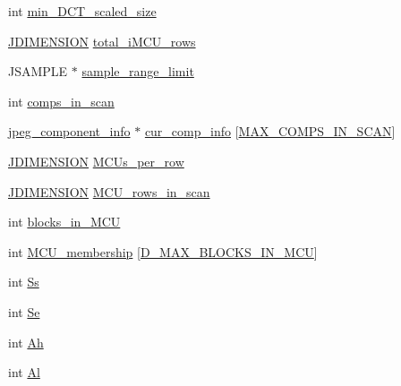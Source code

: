 \begin{DoxyCompactItemize}
\item 
int \hyperlink{structjpeg__decompress__struct_a88783fbd676f2e16a92162a324e79795}{min\+\_\+\+D\+C\+T\+\_\+scaled\+\_\+size}
\item 
\hyperlink{jmorecfg_8h_a04ed4674f6f1d0d50ec241531e38274f}{J\+D\+I\+M\+E\+N\+S\+I\+ON} \hyperlink{structjpeg__decompress__struct_ab210038772e2c74c35b6c0a36db9c6a9}{total\+\_\+i\+M\+C\+U\+\_\+rows}
\item 
J\+S\+A\+M\+P\+LE $\ast$ \hyperlink{structjpeg__decompress__struct_a7208357f11ec6db26e55d7b01d8c7a1b}{sample\+\_\+range\+\_\+limit}
\item 
int \hyperlink{structjpeg__decompress__struct_a2a28db865b9d49bfa9bc6335abf331c3}{comps\+\_\+in\+\_\+scan}
\item 
\hyperlink{structjpeg__component__info}{jpeg\+\_\+component\+\_\+info} $\ast$ \hyperlink{structjpeg__decompress__struct_ab640afe8fb70108caed0c2520aab0c2a}{cur\+\_\+comp\+\_\+info} \mbox{[}\hyperlink{jpeglib_8h_adc7013da016c19051dc623fb3d8b35b4}{M\+A\+X\+\_\+\+C\+O\+M\+P\+S\+\_\+\+I\+N\+\_\+\+S\+C\+AN}\mbox{]}
\item 
\hyperlink{jmorecfg_8h_a04ed4674f6f1d0d50ec241531e38274f}{J\+D\+I\+M\+E\+N\+S\+I\+ON} \hyperlink{structjpeg__decompress__struct_aafebfaa0046cc8b449ce2401c174697f}{M\+C\+Us\+\_\+per\+\_\+row}
\item 
\hyperlink{jmorecfg_8h_a04ed4674f6f1d0d50ec241531e38274f}{J\+D\+I\+M\+E\+N\+S\+I\+ON} \hyperlink{structjpeg__decompress__struct_a6d1110064a4f2fbc46a8831fd148bca6}{M\+C\+U\+\_\+rows\+\_\+in\+\_\+scan}
\item 
int \hyperlink{structjpeg__decompress__struct_a76d2872b589796cb8d66428e660e37fb}{blocks\+\_\+in\+\_\+\+M\+CU}
\item 
int \hyperlink{structjpeg__decompress__struct_abcd46ef2fd7c068bdbdcde43efbd786e}{M\+C\+U\+\_\+membership} \mbox{[}\hyperlink{jpeglib_8h_af974a668decc270fb4d00587618dd110}{D\+\_\+\+M\+A\+X\+\_\+\+B\+L\+O\+C\+K\+S\+\_\+\+I\+N\+\_\+\+M\+CU}\mbox{]}
\item 
int \hyperlink{structjpeg__decompress__struct_a61133b3e8959b3ab4ead2b6e12761176}{Ss}
\item 
int \hyperlink{structjpeg__decompress__struct_a978242a8eb6c75dbb86e8382470b2290}{Se}
\item 
int \hyperlink{structjpeg__decompress__struct_a2df559c55319d0c785b91e95960bea55}{Ah}
\item 
int \hyperlink{structjpeg__decompress__struct_a1dfbdcc8449dbc329a352a75d4046154}{Al}
\item 

\end{DoxyCompactItemize}

